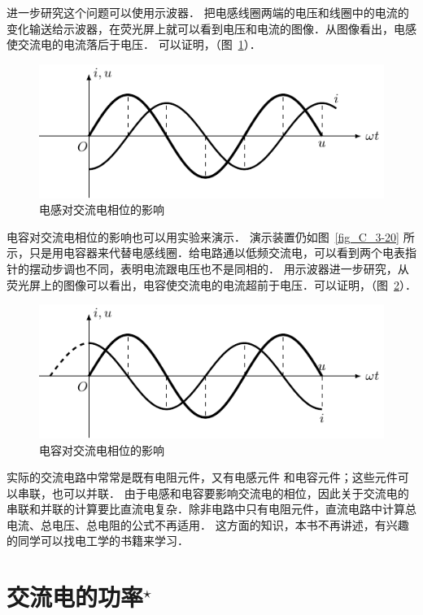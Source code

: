 进一步研究这个问题可以使用示波器．
把电感线圈两端的电压和线圈中的电流的变化输送给示波器，在荧光屏上就可以看到电压和电流的图像．从图像看出，电感使交流电的电流落后于电压．
可以证明，（图~\ref{fig_C_3-21}）．
\begin{figure}[htbp]
    \centering
    \includegraphics{fig/C/3-21.pdf}
    \caption{电感对交流电相位的影响}\label{fig_C_3-21}
\end{figure}

电容对交流电相位的影响也可以用实验来演示．
演示装置仍如图~\ref{fig_C_3-20} 所示，只是用电容器来代替电感线圈．给电路通以低频交流电，可以看到两个电表指针的摆动步调也不同，表明电流跟电压也不是同相的．
用示波器进一步研究，从荧光屏上的图像可以看出，电容使交流电的电流超前于电压．可以证明，（图~\ref{fig_C_3-22}）．

\begin{figure}[htbp]
    \centering
    \includegraphics{fig/C/3-22.pdf}
    \caption{电容对交流电相位的影响}\label{fig_C_3-22}
\end{figure}

实际的交流电路中常常是既有电阻元件，又有电感元件
和电容元件；这些元件可以串联，也可以并联．
由于电感和电容要影响交流电的相位，因此关于交流电的串联和并联的计算要比直流电复杂．除非电路中只有电阻元件，直流电路中计算总电流、总电压、总电阻的公式不再适用．
这方面的知识，本书不再讲述，有兴趣的同学可以找电工学的书籍来学习．

\section{交流电的功率$^\star$}


